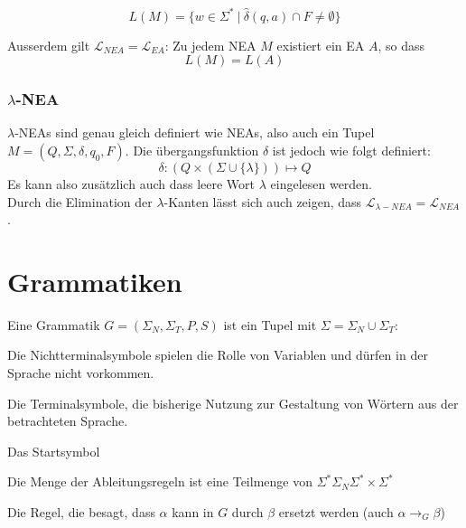 \documentclass[11pt]{article}
\begin{document}
\begin{equation*}
	L(M) = \{w \in \Sigma^*\ |\ \hat\delta(q, a) \cap F \neq \emptyset\}
\end{equation*}

Ausserdem gilt $\mathcal{L}_{NEA} = \mathcal{L}_{EA}$: Zu jedem NEA $M$ existiert ein EA $A$, so dass
\begin{equation*}
	L(M) = L(A)
\end{equation*}

\subsubsection{$\lambda$-NEA}

$\lambda$-NEAs sind genau gleich definiert wie NEAs, also auch ein Tupel $M = (Q, \Sigma, \delta, q_0, F)$. Die {\"u}bergangsfunktion $\delta$ ist jedoch wie folgt definiert:
\begin{equation*}
	\delta: (Q\times(\Sigma \cup \{\lambda\})) \mapsto Q
\end{equation*}
Es kann also zus{\"a}tzlich auch dass leere Wort $\lambda$ eingelesen werden. \\

Durch die Elimination der $\lambda$-Kanten l{\"a}sst sich auch zeigen, dass $\mathcal{L}_{\lambda-NEA} = \mathcal{L}_{NEA}$.

\section{Grammatiken}

Eine Grammatik $G = (\Sigma_N, \Sigma_T, P, S)$ ist ein Tupel mit $\Sigma = \Sigma_N \cup \Sigma_T$:

\begin{description}[labelindent=16pt,style=multiline,leftmargin=3cm, noitemsep]
	\item[$\Sigma_N$:] Die Nichtterminalsymbole spielen die Rolle von Variablen und d{\"u}rfen in der Sprache nicht vorkommen.
	\item[$\Sigma_T$:] Die Terminalsymbole, die bisherige Nutzung zur Gestaltung von W{\"o}rtern aus der betrachteten Sprache.
	\item[$S \in \Sigma_N$:] Das Startsymbol
	\item[$P$:] Die Menge der Ableitungsregeln ist eine Teilmenge von $\Sigma^*\Sigma_N\Sigma^* \times \Sigma^*$
	\item[$(\alpha, \beta) \in P$:] Die Regel, die besagt, dass $\alpha$ kann in $G$ durch $\beta$ ersetzt werden (auch $\alpha \rightarrow_G \beta$)
\end{description}
\end{document}
